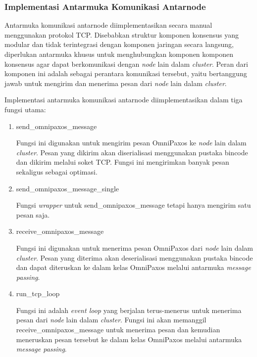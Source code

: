 \subsubsection{Implementasi Antarmuka Komunikasi Antarnode}
\label{subsubsection:implementasi-antarmuka-komunikasi-antarnode}

Antarmuka komunikasi antarnode diimplementasikan secara manual menggunakan protokol TCP. Disebabkan struktur komponen konsensus yang modular dan tidak terintegrasi dengan komponen jaringan secara langsung, diperlukan antarmuka khusus untuk menghubungkan komponen komponen konsensus agar dapat berkomunikasi dengan \textit{node} lain dalam \textit{cluster}. Peran dari komponen ini adalah sebagai perantara komunikasi tersebut, yaitu bertanggung jawab untuk mengirim dan menerima pesan dari \textit{node} lain dalam \textit{cluster}.

Implementasi antarmuka komunikasi antarnode diimplementasikan dalam tiga fungsi utama:
\begin{enumerate}
	\item send\_omnipaxos\_message

	      Fungsi ini digunakan untuk mengirim pesan OmniPaxos ke \textit{node} lain dalam \textit{cluster}. Pesan yang dikirim akan diserialisasi menggunakan pustaka bincode dan dikirim melalui soket TCP. Fungsi ini mengirimkan banyak pesan sekaligus sebagai optimasi.

	\item send\_omnipaxos\_message\_single

	      Fungsi \textit{wrapper} untuk send\_omnipaxos\_message tetapi hanya mengirim satu pesan saja.

	\item receive\_omnipaxos\_message

	      Fungsi ini digunakan untuk menerima pesan OmniPaxos dari \textit{node} lain dalam \textit{cluster}. Pesan yang diterima akan deserialisasi menggunakan pustaka bincode dan dapat diteruskan ke dalam kelas OmniPaxos melalui antarmuka \textit{message passing}.

	\item run\_tcp\_loop

	      Fungsi ini adalah \textit{event loop} yang berjalan terus-menerus untuk menerima pesan dari \textit{node} lain dalam \textit{cluster}. Fungsi ini akan memanggil receive\_omnipaxos\_message untuk menerima pesan dan kemudian meneruskan pesan tersebut ke dalam kelas OmniPaxos melalui antarmuka \textit{message passing}.
\end{enumerate}

